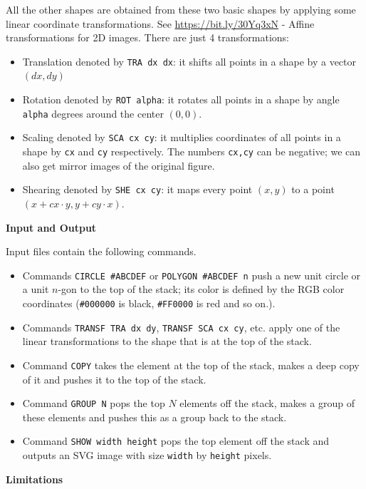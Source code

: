 \documentclass[11pt]{article}
\begin{document}
All the other shapes are obtained from these two basic shapes by applying 
some linear coordinate transformations. 
See \url{https://bit.ly/30Yq3xN} - Affine transformations for 2D images. 
There are just 4 transformations: 

\begin{itemize}
\item Translation denoted by {\tt TRA dx dx}: it shifts all points in a shape by a vector $(dx,dy)$
\item Rotation denoted by {\tt ROT alpha}: it rotates all points in a shape by angle {\tt alpha} degrees
around the center $(0,0)$.
\item Scaling denoted by {\tt SCA cx cy}: it multiplies coordinates of all points in a shape
by {\tt cx} and {\tt cy} respectively. The numbers {\tt cx,cy} can be negative; we can 
also get mirror images of the original figure.
\item Shearing denoted by {\tt SHE cx cy}: it maps every point $(x,y)$ to a point
$(x + cx \cdot y, y + cy \cdot x)$. 
\end{itemize}

\vspace{20pt}
{\bf \large Input and Output}

Input files contain the following commands. 

\begin{itemize}
\item Commands {\tt CIRCLE \#ABCDEF} or {\tt POLYGON \#ABCDEF n} push a new unit circle or a unit $n$-gon 
to the top of the stack; its color is defined by the RGB color coordinates ({\tt \#000000} is black, 
{\tt \#FF0000} is red and so on.). 
\item Commands {\tt TRANSF TRA dx dy}, {\tt TRANSF SCA cx cy}, etc. apply one of the 
linear transformations to the shape that is at the top of the stack. 
\item Command {\tt COPY} takes the element at the top of the stack, makes a deep copy of it and
pushes it to the top of the stack. 
\item Command {\tt GROUP N} pops the top $N$ elements off the stack, makes a group of these 
elements and pushes this as a group back to the stack. 
\item Command {\tt SHOW width height} pops the top element off the stack and outputs an SVG image with 
size {\tt width} by {\tt height} pixels.
\end{itemize}


\vspace{20pt}
{\bf \large  Limitations}
\end{document}
